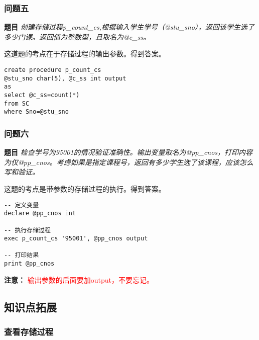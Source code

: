 \subsubsection{问题五}

\textbf{题目} \emph{创建存储过程p\_count\_cs,根据输入学生学号（@stu\_sno），返回该学生选了多少门课。返回值为整数型，且取名为@c\_ss。}

\vspace{6pt}

\qquad 这道题的考点在于存储过程的输出参数。得到答案。

\begin{mdframed}[backgroundcolor=blue!5]
\begin{verbatim}
create procedure p_count_cs
@stu_sno char(5), @c_ss int output
as
select @c_ss=count(*)
from SC
where Sno=@stu_sno
\end{verbatim}
\end{mdframed}

\subsubsection{问题六}

\textbf{题目} \emph{检查学号为95001的情况验证准确性。输出变量取名为@pp\_cnos，打印内容为仅@pp\_cnos。考虑如果是指定课程号，返回有多少学生选了该课程，应该怎么写和验证。}

\vspace{6pt}

\qquad 这题的考点是带参数的存储过程的执行。得到答案。

\begin{mdframed}[backgroundcolor=blue!5]
\begin{verbatim}
-- 定义变量
declare @pp_cnos int

-- 执行存储过程
exec p_count_cs '95001', @pp_cnos output

-- 打印结果
print @pp_cnos
\end{verbatim}
\end{mdframed}

\textbf{注意：} \textcolor{red}{输出参数的后面要加output，不要忘记。}

\subsection{知识点拓展}

\subsubsection{查看存储过程}

